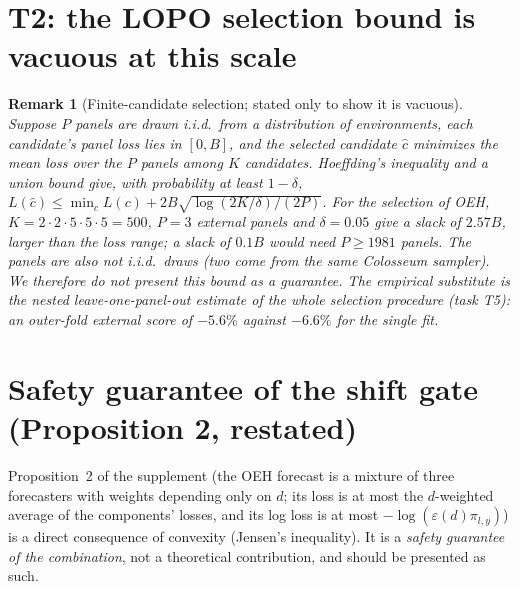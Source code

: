 \documentclass[10pt]{article}
\newtheorem{remark}{Remark}
\begin{document}
\section{T2: the LOPO selection bound is vacuous at this scale}

\begin{remark}[Finite-candidate selection; stated only to show it is vacuous]
Suppose $P$ panels are drawn i.i.d.\ from a distribution of environments, each candidate's panel loss lies in $[0,B]$, and the selected candidate $\hat c$ minimizes the mean loss over the $P$ panels among $K$ candidates. Hoeffding's inequality and a union bound give, with probability at least $1-\delta$,
$L(\hat c)\le\min_c L(c)+2B\sqrt{\log(2K/\delta)/(2P)}$.
For the selection of OEH, $K=2\cdot2\cdot5\cdot5\cdot5=500$, $P=3$ external panels and $\delta=0.05$ give a slack of $2.57B$, larger than the loss range; a slack of $0.1B$ would need $P\ge1981$ panels. The panels are also not i.i.d.\ draws (two come from the same Colosseum sampler). We therefore do \emph{not} present this bound as a guarantee. The empirical substitute is the nested leave-one-panel-out estimate of the whole selection procedure (task T5): an outer-fold external score of $-5.6\%$ against $-6.6\%$ for the single fit.
\end{remark}

\section{Safety guarantee of the shift gate (Proposition 2, restated)}
Proposition~2 of the supplement (the OEH forecast is a mixture of three forecasters with weights depending only on $d$; its loss is at most the $d$-weighted average of the components' losses, and its log loss is at most $-\log(\varepsilon(d)\pi_{l,y})$) is a direct consequence of convexity (Jensen's inequality). It is a \emph{safety guarantee of the combination}, not a theoretical contribution, and should be presented as such.
\end{document}
